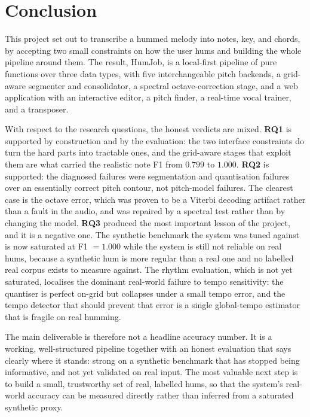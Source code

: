 \documentclass[12pt,a4paper]{article}
\begin{document}
\section{Conclusion}

This project set out to transcribe a hummed melody into notes, key, and chords,
by accepting two small constraints on how the user hums and building the whole
pipeline around them. The result, HumJob, is a local-first pipeline of pure
functions over three data types, with five interchangeable pitch backends, a
grid-aware segmenter and consolidator, a spectral octave-correction stage, and a
web application with an interactive editor, a pitch finder, a real-time vocal
trainer, and a transposer.

With respect to the research questions, the honest verdicts are mixed.
\textbf{RQ1} is supported by construction and by the evaluation: the two
interface constraints do turn the hard parts into tractable ones, and the
grid-aware stages that exploit them are what carried the realistic note F1 from
$0.799$ to $1.000$. \textbf{RQ2} is supported: the diagnosed failures were
segmentation and quantisation failures over an essentially correct pitch
contour, not pitch-model failures. The clearest case is the octave error, which
was proven to be a Viterbi decoding artifact rather than a fault in the audio,
and was repaired by a spectral test rather than by changing the model.
\textbf{RQ3} produced the most important lesson of the project, and it is a
negative one. The synthetic benchmark the system was tuned against is now
saturated at F1 $=1.000$ while the system is still not reliable on real hums,
because a synthetic hum is more regular than a real one and no labelled real
corpus exists to measure against. The rhythm evaluation, which is not yet
saturated, localises the dominant real-world failure to tempo sensitivity: the
quantiser is perfect on-grid but collapses under a small tempo error, and the
tempo detector that should prevent that error is a single global-tempo
estimator that is fragile on real humming.

The main deliverable is therefore not a headline accuracy number. It is a
working, well-structured pipeline together with an honest evaluation that says
clearly where it stands: strong on a synthetic benchmark that has stopped being
informative, and not yet validated on real input. The most valuable next step
is to build a small, trustworthy set of real, labelled hums, so that the
system's real-world accuracy can be measured directly rather than inferred from
a saturated synthetic proxy.
\end{document}
